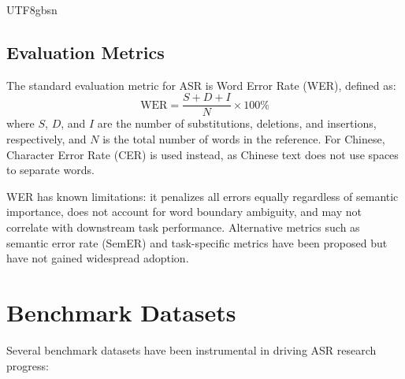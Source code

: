 \documentclass[12pt,a4paper]{article}
\begin{document}
\begin{CJK}{UTF8}{gbsn}
\subsection{Evaluation Metrics}
\label{subsec:metrics}

The standard evaluation metric for ASR is Word Error Rate (WER), defined as:
\begin{equation}
    \text{WER} = \frac{S + D + I}{N} \times 100\%
\end{equation}
where $S$, $D$, and $I$ are the number of substitutions, deletions, and insertions, respectively, and $N$ is the total number of words in the reference. For Chinese, Character Error Rate (CER) is used instead, as Chinese text does not use spaces to separate words.

WER has known limitations: it penalizes all errors equally regardless of semantic importance, does not account for word boundary ambiguity, and may not correlate with downstream task performance. Alternative metrics such as semantic error rate (SemER) and task-specific metrics have been proposed but have not gained widespread adoption.

\section{Benchmark Datasets}
\label{sec:benchmarks}

Several benchmark datasets have been instrumental in driving ASR research progress:


\end{CJK}
\end{document}
